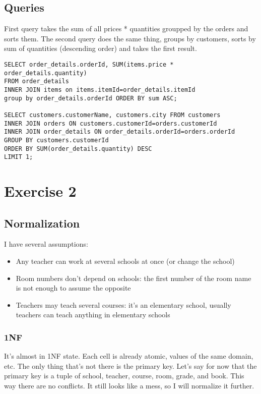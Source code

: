 \documentclass[11pt]{article}
\begin{document}
\subsection{Queries}
\label{sec:org4f468b3}
First query takes the sum of all prices * quantities groupped by the orders and sorts them.
The second query does the same thing, groups by customers, sorts by sum of quantities (descending order) and takes the first result.
\begin{verbatim}
SELECT order_details.orderId, SUM(items.price * order_details.quantity)
FROM order_details
INNER JOIN items on items.itemId=order_details.itemId
group by order_details.orderId ORDER BY sum ASC;

SELECT customers.customerName, customers.city FROM customers
INNER JOIN orders ON customers.customerId=orders.customerId
INNER JOIN order_details ON order_details.orderId=orders.orderId
GROUP BY customers.customerId
ORDER BY SUM(order_details.quantity) DESC
LIMIT 1;
\end{verbatim}

\section{Exercise 2}
\label{sec:org99a84d3}
\subsection{Normalization}
\label{sec:org77cd4b4}
I have several assumptions:
\begin{itemize}
\item Any teacher can work at several schools at once (or change the school)
\item Room numbers don't depend on schools: the first number of the room name is not enough to assume the opposite
\item Teachers may teach several courses: it's an elementary school, usually teachers can teach anything in elementary schools
\end{itemize}

\subsubsection{1NF}
\label{sec:org4242f0d}
It's almost in 1NF state. Each cell is already atomic, values of the same domain, etc. The only thing that's not there is the primary key. Let's say for now that the primary key is a tuple of school, teacher, course, room, grade, and book. This way there are no conflicts. It still looks like a mess, so I will normalize it further.
\end{document}

